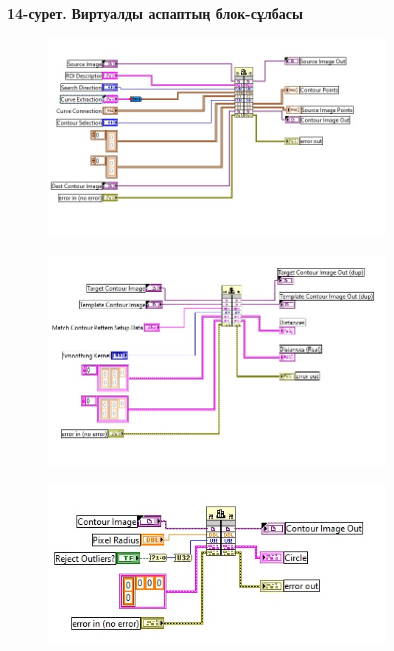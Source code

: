 {\bfseries 14-сурет.} {\bfseries Виртуалды аспаптың блок-сұлбасы}


\begin{figure}[H]
	\centering
	\includegraphics[width=0.8\textwidth]{media/ict2/image183}
	\caption*{}
\end{figure}


\begin{figure}[H]
	\centering
	\includegraphics[width=0.8\textwidth]{media/ict2/image184}
	\caption*{}
\end{figure}



\begin{figure}[H]
	\centering
	\includegraphics[width=0.8\textwidth]{media/ict2/image185}
	\caption*{}
\end{figure}


